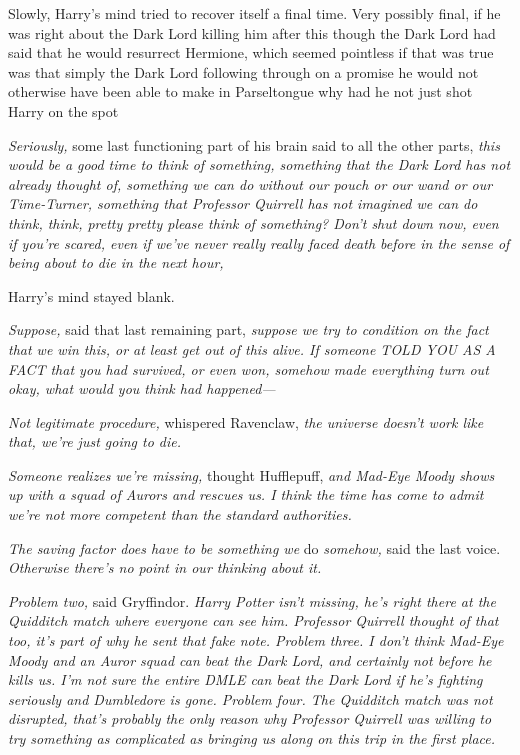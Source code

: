Slowly, Harry's mind tried to recover itself a final time. Very possibly final,
if he was right about the Dark Lord killing him after this{\el} though the
Dark Lord had said that he would resurrect Hermione, which seemed pointless if
that was true{\el} was that simply the Dark Lord following through on a
promise he would not otherwise have been able to make in Parseltongue{\el}
why had he not just shot Harry on the spot{\el}

\emph{Seriously,} some last functioning part of his brain said to all the other
parts, \emph{this would be a good time to think of something, something that
the Dark Lord has not already thought of, something we can do without our pouch
or our wand or our Time-Turner, something that Professor Quirrell has not
imagined we can do{\el} think, think, pretty pretty please think of
something? Don't shut down now, even if you're scared, even if we've never
really really faced death before in the sense of being about to die in the next
hour, }

Harry's mind stayed blank.

\emph{Suppose,} said that last remaining part, \emph{suppose we try to
condition on the fact that we win this, or at least get out of this alive. If
someone TOLD YOU AS A FACT that you had survived, or even won, somehow made
everything turn out okay, what would you think had happened---}

\emph{Not legitimate procedure,} whispered Ravenclaw, \emph{the universe
doesn't work like that, we're just going to die.}

\emph{Someone realizes we're missing,} thought Hufflepuff, \emph{and Mad-Eye
Moody shows up with a squad of Aurors and rescues us. I think the time has come
to admit we're not more competent than the standard authorities.}

\emph{The saving factor does have to be something we} do \emph{somehow,} said
the last voice. \emph{Otherwise there's no point in our thinking about it.}

\emph{Problem two,} said Gryffindor. \emph{Harry Potter isn't missing, he's
right there at the Quidditch match where everyone can see him. Professor
Quirrell thought of that too, it's part of why he sent that fake note. Problem
three. I don't think Mad-Eye Moody and an Auror squad can beat the Dark Lord,
and certainly not before he kills us. I'm not sure the entire DMLE can beat the
Dark Lord if he's fighting seriously and Dumbledore is gone. Problem four. The
Quidditch match was not disrupted, that's probably the only reason why
Professor Quirrell was willing to try something as complicated as bringing us
along on this trip in the first place.}

